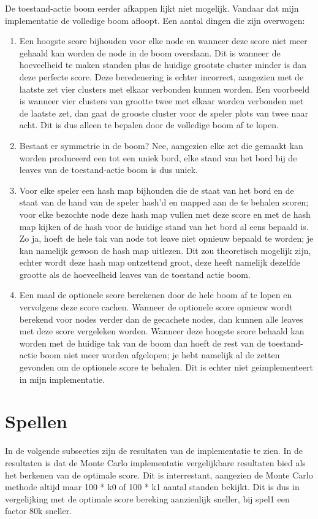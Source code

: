 \documentclass[10pt]{article}
\begin{document}
De toestand-actie boom eerder afkappen lijkt niet mogelijk.
Vandaar dat mijn implementatie de volledige boom afloopt.
Een aantal dingen die zijn overwogen:
\begin{enumerate}
    \item Een hoogste score bijhouden voor elke node en wanneer deze score niet meer gehaald kan worden de node in de boom overslaan. Dit is wanneer de hoeveelheid te maken standen plus de huidige grootste cluster minder is dan deze perfecte score. Deze beredenering is echter incorrect, aangezien met de laatste zet vier clusters met elkaar verbonden kunnen worden. Een voorbeeld is wanneer vier clusters van grootte twee met elkaar worden verbonden met de laatste zet, dan gaat de grooste cluster voor de speler plots van twee naar acht. Dit is dus alleen te bepalen door de volledige boom af te lopen.
    \item Bestaat er symmetrie in de boom? Nee, aangezien elke zet die gemaakt kan worden produceerd een tot een uniek bord, elke stand van het bord bij de leaves van de toestand-actie boom is dus uniek. 
    \item Voor elke speler een hash map bijhouden die de staat van het bord en de staat van de hand van de speler hash'd en mapped aan de te behalen scoren; voor elke bezochte node deze hash map vullen met deze score en met de hash map kijken of de hash voor de huidige stand van het bord al eens bepaald is. Zo ja, hoeft de hele tak van node tot leave niet opnieuw bepaald te worden; je kan namelijk gewoon de hash map uitlezen. Dit zou theoretisch mogelijk zijn, echter wordt deze hash map ontzettend groot, deze heeft namelijk dezelfde grootte als de hoeveelheid leaves van de toestand actie boom.
    \item Een maal de optionele score berekenen door de hele boom af te lopen en vervolgens deze score cachen. Wanneer de optionele score opnieuw wordt berekend voor nodes verder dan de gecachete nodes, dan kunnen alle leaves met deze score vergeleken worden. Wanneer deze hoogste score behaald kan worden met de huidige tak van de boom dan hoeft de rest van de toestand-actie boom niet meer worden afgelopen; je hebt namelijk al de zetten gevonden om de optionele score te behalen. Dit is echter niet geimplementeert in mijn implementatie.
\end{enumerate}


\section{Spellen}
In de volgende subsecties zijn de resultaten van de implementatie te zien.
In de resultaten is dat de Monte Carlo implementatie vergelijkbare resultaten bied als het berkenen van de optimale score.
Dit is interrestant, aangezien de Monte Carlo methode altijd maar 100 * k0 of 100 * k1 aantal standen bekijkt.
Dit is dus in vergelijking met de optimale score bereking aanzienlijk sneller, bij spel1 een factor 80k sneller.
\end{document}
